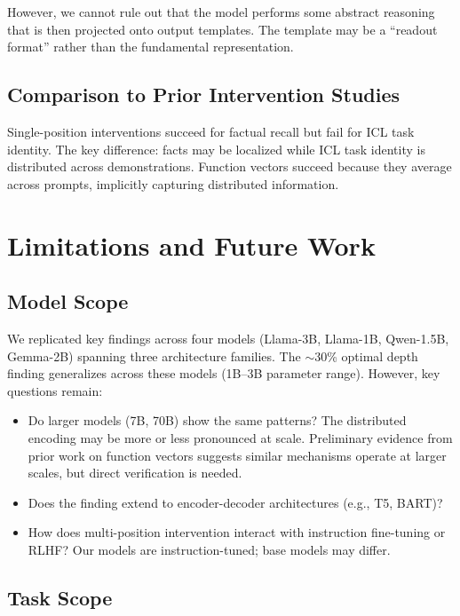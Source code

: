 \documentclass[11pt]{article}
\begin{document}
However, we cannot rule out that the model performs some abstract reasoning that is then projected onto output templates. The template may be a ``readout format'' rather than the fundamental representation.

\subsection{Comparison to Prior Intervention Studies}

Single-position interventions succeed for factual recall \citep{meng2022locating} but fail for ICL task identity. The key difference: facts may be localized while ICL task identity is distributed across demonstrations. Function vectors \citep{todd2023function} succeed because they average across prompts, implicitly capturing distributed information.

\section{Limitations and Future Work}
\label{app:limitations}

\subsection{Model Scope}

We replicated key findings across four models (Llama-3B, Llama-1B, Qwen-1.5B, Gemma-2B) spanning three architecture families. The $\sim$30\% optimal depth finding generalizes across these models (1B--3B parameter range). However, key questions remain:
\begin{itemize}
    \item Do larger models (7B, 70B) show the same patterns? The distributed encoding may be more or less pronounced at scale. Preliminary evidence from prior work on function vectors \citep{todd2023function} suggests similar mechanisms operate at larger scales, but direct verification is needed.
    \item Does the finding extend to encoder-decoder architectures (e.g., T5, BART)?
    \item How does multi-position intervention interact with instruction fine-tuning or RLHF? Our models are instruction-tuned; base models may differ.
\end{itemize}

\subsection{Task Scope}
\end{document}
